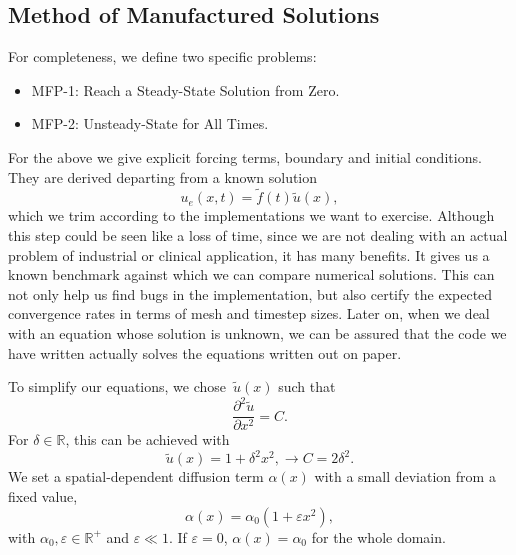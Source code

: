 \documentclass[../main.tex]{subfiles}
\begin{document}
\subsection{Method of Manufactured Solutions}
\label{sec:1d_fom_toy_problem}
For completeness, we define two specific problems:
\begin{itemize}
    \item MFP-1: Reach a Steady-State Solution from Zero.
    \item MFP-2: Unsteady-State for All Times.
\end{itemize}
For the above we give explicit forcing terms, boundary and initial conditions.
They are derived departing from a known solution
\begin{equation}
    u_e(x,t) = \tilde{f}(t) \tilde{u}(x),
\end{equation}
which we trim according to the implementations we want to exercise.
Although this step could be seen like a loss of time, since we are not dealing with an actual problem of industrial or clinical application, it has many benefits.
It gives us a known benchmark against which we can compare numerical solutions.
This can not only help us find bugs in the implementation, but also certify the expected convergence rates in terms of mesh and timestep sizes.
Later on, when we deal with an equation whose solution is unknown, we can be assured that the code we have written actually solves the equations written out on paper. 

To simplify our equations, we chose~$\tilde{u}(x)$ such that
\begin{equation}
    \frac{\partial^2\tilde{u}}{\partial x^2} = C.
\end{equation}
For $\delta\in\mathbb{R}$, this can be achieved with 
\begin{equation}
    \tilde{u}(x) = 1 + \delta^2 x^2, \rightarrow C = 2 \delta^2.
\end{equation}
We set a spatial-dependent diffusion term $\alpha(x)$ with a small deviation from a fixed value,
\begin{equation}
    \label{eq:1d_fom_mfp_diffusion_term}
    \alpha(x) = \alpha_0(1 + \varepsilon x^2),
\end{equation}
with $\alpha_0, \varepsilon \in \mathbb{R}^{+}$ and $\varepsilon \ll 1$.
If $\varepsilon=0$, $\alpha(x) = \alpha_0$ for the whole domain.

\end{document}
